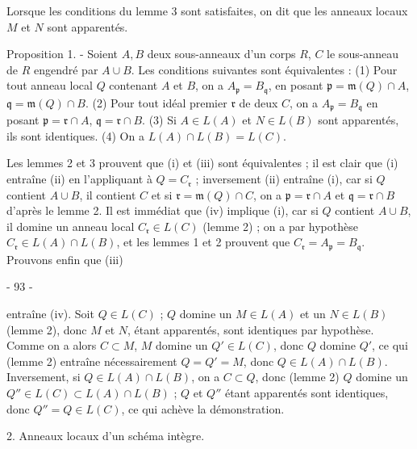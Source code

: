 Lorsque les conditions du lemme 3 sont satisfaites, on dit que les anneaux locaux $M$ et $N$ sont apparentés.

Proposition 1. - Soient $A, B$ deux sous-anneaux d'un corps $R$, $C$ le sous-anneau de $R$ engendré par $A \cup B$. Les conditions suivantes sont équivalentes :
(1) Pour tout anneau local $Q$ contenant $A$ et $B$, on a $A_{\mathfrak{p}} = B_{\mathfrak{q}}$, en posant $\mathfrak{p} = \mathfrak{m}(Q) \cap A$, $\mathfrak{q} = \mathfrak{m}(Q) \cap B$.
(2) Pour tout idéal premier $\mathfrak{r}$ de deux $C$, on a $A_{\mathfrak{p}} = B_{\mathfrak{q}}$ en posant $\mathfrak{p} = \mathfrak{r} \cap A$, $\mathfrak{q} = \mathfrak{r} \cap B$.
(3) Si $A \in L(A)$ et $N \in L(B)$ sont apparentés, ils sont identiques.
(4) On a $L(A) \cap L(B) = L(C)$.

Les lemmes 2 et 3 prouvent que (i) et (iii) sont équivalentes ; il est clair que (i) entraîne (ii) en l'appliquant à $Q = C_{\mathfrak{r}}$ ; inversement (ii) entraîne (i), car si $Q$ contient $A \cup B$, il contient $C$ et si $\mathfrak{r} = \mathfrak{m}(Q) \cap C$, on a $\mathfrak{p} = \mathfrak{r} \cap A$ et $\mathfrak{q} = \mathfrak{r} \cap B$ d'après le lemme 2. Il est immédiat que (iv) implique (i), car si $Q$ contient $A \cup B$, il domine un anneau local $C_{\mathfrak{r}} \in L(C)$ (lemme 2) ; on a par hypothèse $C_{\mathfrak{r}} \in L(A) \cap L(B)$, et les lemmes 1 et 2 prouvent que $C_{\mathfrak{r}} = A_{\mathfrak{p}} = B_{\mathfrak{q}}$. Prouvons enfin que (iii)

\newpage


- 93 -

entraîne (iv). Soit $Q \in L(C)$ ; $Q$ domine un $M \in L(A)$ et un $N \in L(B)$ (lemme 2), donc $M$ et $N$, étant apparentés, sont identiques par hypothèse. Comme on a alors $C \subset M$, $M$ domine un $Q' \in L(C)$, donc $Q$ domine $Q'$, ce qui (lemme 2) entraîne nécessairement $Q=Q'=M$, donc $Q \in L(A) \cap L(B)$. Inversement, si $Q \in L(A) \cap L(B)$, on a $C \subset Q$, donc (lemme 2) $Q$ domine un $Q'' \in L(C) \subset L(A) \cap L(B)$ ; $Q$ et $Q''$ étant apparentés sont identiques, donc $Q''=Q \in L(C)$, ce qui achève la démonstration.

2. Anneaux locaux d'un schéma intègre.

